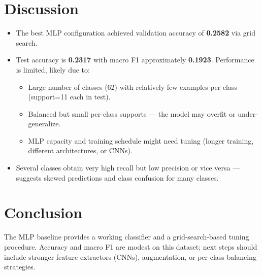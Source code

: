 \documentclass[11pt,a4paper]{article}
\begin{document}
\section{Discussion}
\begin{itemize}
  \item The best MLP configuration achieved validation accuracy of \textbf{0.2582} via grid search.
  \item Test accuracy is \textbf{0.2317} with macro F1 approximately \textbf{0.1923}. Performance is limited, likely due to:
    \begin{itemize}
      \item Large number of classes (62) with relatively few examples per class (support=11 each in test).
      \item Balanced but small per-class supports — the model may overfit or under-generalize.
      \item MLP capacity and training schedule might need tuning (longer training, different architectures, or CNNs).
    \end{itemize}
  \item Several classes obtain very high recall but low precision or vice versa — suggests skewed predictions and class confusion for many classes.
\end{itemize}

\section{Conclusion}
The MLP baseline provides a working classifier and a grid-search-based tuning procedure. Accuracy and macro F1 are modest on this dataset; next steps should include stronger feature extractors (CNNs), augmentation, or per-class balancing strategies.
\end{document}
